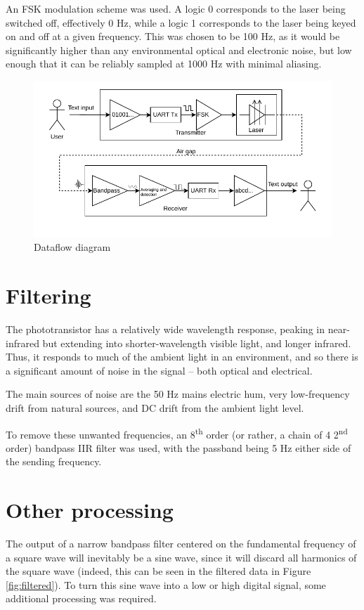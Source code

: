 \documentclass{article}
\begin{document}
\begin{multicols}{2}
An FSK modulation scheme was used. A logic 0 corresponds to the laser being switched off, effectively 0 Hz, while a logic 1 corresponds to the laser being keyed on and off at a given frequency. This was chosen to be 100 Hz, as it would be significantly higher than any environmental optical and electronic noise, but low enough that it can be reliably sampled at 1000 Hz with minimal aliasing.

\begin{figure}[H]
    \includegraphics[width=\linewidth]{figures/dataflow.pdf}
    \caption{Dataflow diagram}
    \label{fig:dataflow}
\end{figure}

\section{Filtering}
The phototransistor has a relatively wide wavelength response, peaking in near-infrared but extending into shorter-wavelength visible light, and longer infrared. Thus, it responds to much of the ambient light in an environment, and so there is a significant amount of noise in the signal -- both optical and electrical.

The main sources of noise are the 50 Hz mains electric hum, very low-frequency drift from natural sources, and DC drift from the ambient light level. 

To remove these unwanted frequencies, an 8\textsuperscript{th} order (or rather, a chain of 4 2\textsuperscript{nd} order) bandpass IIR filter was used, with the passband being 5 Hz either side of the sending frequency. 

\section{Other processing}
The output of a narrow bandpass filter centered on the fundamental frequency of a square wave will inevitably be a sine wave, since it will discard all harmonics of the square wave (indeed, this can be seen in the filtered data in Figure \ref{fig:filtered}). To turn this sine wave into a low or high digital signal, some additional processing was required. 


\end{multicols}
\end{document}

